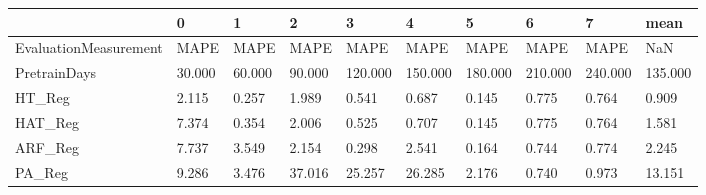 \begin{tabular}{llllllllll}
\toprule
{} &      0 &      1 &      2 &       3 &       4 &       5 &       6 &       7 &    mean \\
\midrule
EvaluationMeasurement &   MAPE &   MAPE &   MAPE &    MAPE &    MAPE &    MAPE &    MAPE &    MAPE &     NaN \\
PretrainDays          & 30.000 & 60.000 & 90.000 & 120.000 & 150.000 & 180.000 & 210.000 & 240.000 & 135.000 \\
HT\_Reg                &  2.115 &  0.257 &  1.989 &   0.541 &   0.687 &   0.145 &   0.775 &   0.764 &   0.909 \\
HAT\_Reg               &  7.374 &  0.354 &  2.006 &   0.525 &   0.707 &   0.145 &   0.775 &   0.764 &   1.581 \\
ARF\_Reg               &  7.737 &  3.549 &  2.154 &   0.298 &   2.541 &   0.164 &   0.744 &   0.774 &   2.245 \\
PA\_Reg                &  9.286 &  3.476 & 37.016 &  25.257 &  26.285 &   2.176 &   0.740 &   0.973 &  13.151 \\
\bottomrule
\end{tabular}
